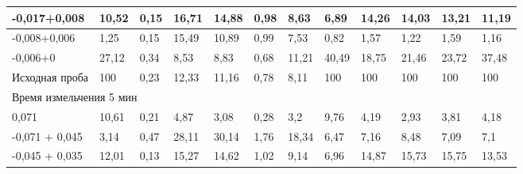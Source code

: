 {\begin{longtable}[c]{|p{}lllllllllll|}
\multicolumn{1}{|l|}{-0,017+0,008} & \multicolumn{1}{l|}{10,52} & \multicolumn{1}{l|}{0,15} & \multicolumn{1}{l|}{16,71} & \multicolumn{1}{l|}{14,88} & \multicolumn{1}{l|}{0,98} & \multicolumn{1}{l|}{8,63} & \multicolumn{1}{l|}{6,89} & \multicolumn{1}{l|}{14,26} & \multicolumn{1}{l|}{14,03} & \multicolumn{1}{l|}{13,21} & 11,19 \\ \hline
\multicolumn{1}{|l|}{-0,008+0,006} & \multicolumn{1}{l|}{1,25} & \multicolumn{1}{l|}{0,15} & \multicolumn{1}{l|}{15,49} & \multicolumn{1}{l|}{10,89} & \multicolumn{1}{l|}{0,99} & \multicolumn{1}{l|}{7,53} & \multicolumn{1}{l|}{0,82} & \multicolumn{1}{l|}{1,57} & \multicolumn{1}{l|}{1,22} & \multicolumn{1}{l|}{1,59} & 1,16 \\ \hline
\multicolumn{1}{|l|}{-0,006+0} & \multicolumn{1}{l|}{27,12} & \multicolumn{1}{l|}{0,34} & \multicolumn{1}{l|}{8,53} & \multicolumn{1}{l|}{8,83} & \multicolumn{1}{l|}{0,68} & \multicolumn{1}{l|}{11,21} & \multicolumn{1}{l|}{40,49} & \multicolumn{1}{l|}{18,75} & \multicolumn{1}{l|}{21,46} & \multicolumn{1}{l|}{23,72} & 37,48 \\ \hline
\multicolumn{1}{|l|}{Исходная проба} & \multicolumn{1}{l|}{100} & \multicolumn{1}{l|}{0,23} & \multicolumn{1}{l|}{12,33} & \multicolumn{1}{l|}{11,16} & \multicolumn{1}{l|}{0,78} & \multicolumn{1}{l|}{8,11} & \multicolumn{1}{l|}{100} & \multicolumn{1}{l|}{100} & \multicolumn{1}{l|}{100} & \multicolumn{1}{l|}{100} & 100 \\ \hline
\multicolumn{12}{|l|}{Время измельчения 5 мин} \\ \hline
\multicolumn{1}{|l|}{0,071} & \multicolumn{1}{l|}{10,61} & \multicolumn{1}{l|}{0,21} & \multicolumn{1}{l|}{4,87} & \multicolumn{1}{l|}{3,08} & \multicolumn{1}{l|}{0,28} & \multicolumn{1}{l|}{3,2} & \multicolumn{1}{l|}{9,76} & \multicolumn{1}{l|}{4,19} & \multicolumn{1}{l|}{2,93} & \multicolumn{1}{l|}{3,81} & 4,18 \\ \hline
\multicolumn{1}{|l|}{-0,071 + 0,045} & \multicolumn{1}{l|}{3,14} & \multicolumn{1}{l|}{0,47} & \multicolumn{1}{l|}{28,11} & \multicolumn{1}{l|}{30,14} & \multicolumn{1}{l|}{1,76} & \multicolumn{1}{l|}{18,34} & \multicolumn{1}{l|}{6,47} & \multicolumn{1}{l|}{7,16} & \multicolumn{1}{l|}{8,48} & \multicolumn{1}{l|}{7,09} & 7,1 \\ \hline
\multicolumn{1}{|l|}{-0,045 + 0,035} & \multicolumn{1}{l|}{12,01} & \multicolumn{1}{l|}{0,13} & \multicolumn{1}{l|}{15,27} & \multicolumn{1}{l|}{14,62} & \multicolumn{1}{l|}{1,02} & \multicolumn{1}{l|}{9,14} & \multicolumn{1}{l|}{6,96} & \multicolumn{1}{l|}{14,87} & \multicolumn{1}{l|}{15,73} & \multicolumn{1}{l|}{15,75} & 13,53 \\ \hline

\end{longtable}}
